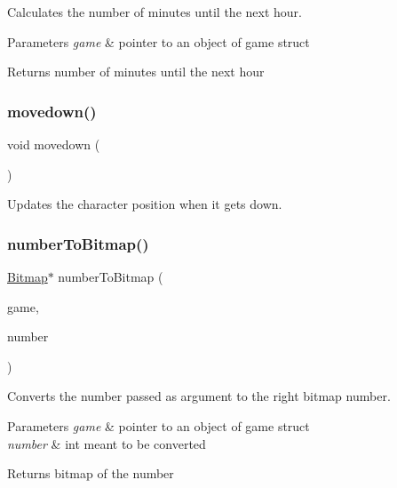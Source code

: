 Calculates the number of minutes until the next hour. 


\begin{DoxyParams}{Parameters}
{\em game} & pointer to an object of game struct \\
\hline
\end{DoxyParams}
\begin{DoxyReturn}{Returns}
number of minutes until the next hour 
\end{DoxyReturn}
\mbox{\label{group___graphics_ga84ffc930c9e1c8c6de9173eadd3c975d}} 
\subsubsection{\texorpdfstring{movedown()}{movedown()}}
{\footnotesize\ttfamily void movedown (\begin{DoxyParamCaption}{ }\end{DoxyParamCaption})}



Updates the character position when it gets down. 

\mbox{\label{group___graphics_ga2480f417fa8ca1b9b31cf7677dff4541}} 
\subsubsection{\texorpdfstring{number\+To\+Bitmap()}{numberToBitmap()}}
{\footnotesize\ttfamily \hyperlink{struct_bitmap}{Bitmap}$\ast$ number\+To\+Bitmap (\begin{DoxyParamCaption}\item[{\hyperlink{struct_game}{Game} $\ast$}]{game,  }\item[{int}]{number }\end{DoxyParamCaption})}



Converts the number passed as argument to the right bitmap number. 


\begin{DoxyParams}{Parameters}
{\em game} & pointer to an object of game struct \\
\hline
{\em number} & int meant to be converted \\
\hline
\end{DoxyParams}
\begin{DoxyReturn}{Returns}
bitmap of the number 
\end{DoxyReturn}
\mbox{\label{group___graphics_gab2dd31b45cae53400c50cc728db456ca}} 
